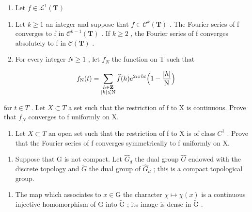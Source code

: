 \begin{enumerate}
\def\labelenumi{\arabic{enumi})}
\setcounter{enumi}{52}
\tightlist
\item
  Let \(f\in \mathcal{L}^1 (\mathbf{T})\)
\end{enumerate}

\begin{enumerate}
\def\labelenumi{\alph{enumi})}
\item
  Let \(k \geqslant 1\) an integer and suppose that \(f \in \mathcal{C}^{k}(\mathbf{T})\) . The Fourier series of f converges to f in \(\mathcal{C}^{k-1}(\mathbf{T})\) . If \(k \geqslant 2\) , the Fourier series of f converges absolutely to f in \(\mathcal{C}(\mathbf{T})\) .
\item
  For every integer \(N \geqslant 1\) , let \(f_{N}\) the function on T such that
\end{enumerate}

\[
f_{\mathrm{N}}(t) = \sum_{\substack{h\in \mathbf{Z}\\ |h|\leqslant \mathrm{N}}}\widehat{f} (h)e^{2i\pi ht}\Bigl (1 - \frac{|h|}{\mathrm{N}}\Bigr)
\]

for \(t \in T\) . Let \(X \subset T\) a set such that the restriction of f to X is continuous. Prove that \(f_{N}\) converges to f uniformly on X.

\begin{enumerate}
\def\labelenumi{\alph{enumi})}
\setcounter{enumi}{2}
\tightlist
\item
  Let \(X \subset T\) an open set such that the restriction of f to X is of class \(C^{1}\) . Prove that the Fourier series of f converges symmetrically to f uniformly on X.
\end{enumerate}

\begin{enumerate}
\def\labelenumi{\arabic{enumi})}
\setcounter{enumi}{53}
\tightlist
\item
  Suppose that G is not compact. Let \(\widehat{G}_{d}\) the dual group \(\widehat{G}\) endowed with the discrete topology and \(\widetilde{G}\) the dual group of \(\widehat{G}_{d}\) ; this is a compact topological group.
\end{enumerate}

\begin{enumerate}
\def\labelenumi{\alph{enumi})}
\tightlist
\item
  The map which associates to \(x \in \mathrm{G}\) the character \(\chi \mapsto \chi(x)\) is a continuous injective homomorphism of \(\mathrm{G}\) into \(\widetilde{\mathrm{G}}\) ; its image is dense in \(\widetilde{\mathrm{G}}\) .
\end{enumerate}

